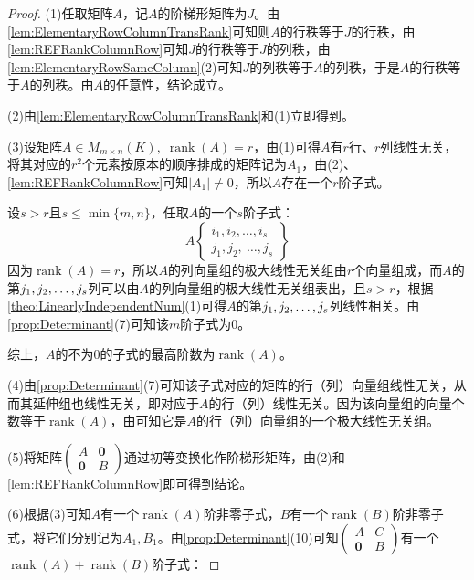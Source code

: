 \begin{proof}
	(1)任取矩阵$A$，记$A$的阶梯形矩阵为$J$。由\cref{lem:ElementaryRowColumnTransRank}可知则$A$的行秩等于$J$的行秩，由\cref{lem:REFRankColumnRow}可知$J$的行秩等于$J$的列秩，由\cref{lem:ElementaryRowSameColumn}(2)可知$J$的列秩等于$A$的列秩，于是$A$的行秩等于$A$的列秩。由$A$的任意性，结论成立。\par
	(2)由\cref{lem:ElementaryRowColumnTransRank}和(1)立即得到。\par
	(3)设矩阵$A\in M_{m\times n}(K),\;\operatorname{rank}(A)=r$，由(1)可得$A$有$r$行、$r$列线性无关，将其对应的$r^2$个元素按原本的顺序排成的矩阵记为$A_1$，由(2)、\cref{lem:REFRankColumnRow}可知$|A_1|\ne0$，所以$A$存在一个$r$阶子式。\par
	设$s>r$且$s\leqslant\min\{m,n\}$，任取$A$的一个$s$阶子式：
	\begin{equation*}
		A\left\{ \begin{array}{l}
			i_1,i_2,\dots,i_s \\
			j_1,j_2,\ \dots,j_s
		\end{array}\right\}
	\end{equation*}
	因为$\operatorname{rank}(A)=r$，所以$A$的列向量组的极大线性无关组由$r$个向量组成，而$A$的第$j_1, j_2, \dots, j_{s}$列可以由$A$的列向量组的极大线性无关组表出，且$s>r$，根据\cref{theo:LinearlyIndependentNum}(1)可得$A$的第$j_1, j_2, \dots, j_{s}$列线性相关。由\cref{prop:Determinant}(7)可知该$m$阶子式为$0$。\par
	综上，$A$的不为$0$的子式的最高阶数为$\operatorname{rank}(A)$。\par
	(4)由\cref{prop:Determinant}(7)可知该子式对应的矩阵的行（列）向量组线性无关，从而其延伸组也线性无关，即对应于$A$的行（列）线性无关。因为该向量组的向量个数等于$\operatorname{rank}(A)$，由可知它是$A$的行（列）向量组的一个极大线性无关组。\par
	(5)将矩阵$\begin{pmatrix}
		A & \mathbf{0} \\
		\mathbf{0} & B
	\end{pmatrix}$通过初等变换化作阶梯形矩阵，由(2)和\cref{lem:REFRankColumnRow}即可得到结论。\par
	(6)根据(3)可知$A$有一个$\operatorname{rank}(A)$阶非零子式，$B$有一个$\operatorname{rank}(B)$阶非零子式，将它们分别记为$A_1,B_1$。由\cref{prop:Determinant}(10)可知$\begin{pmatrix}
		A & C \\
		\mathbf{0} & B
	\end{pmatrix}$有一个$\operatorname{rank}(A)+\operatorname{rank}(B)$阶子式：

\end{proof}
